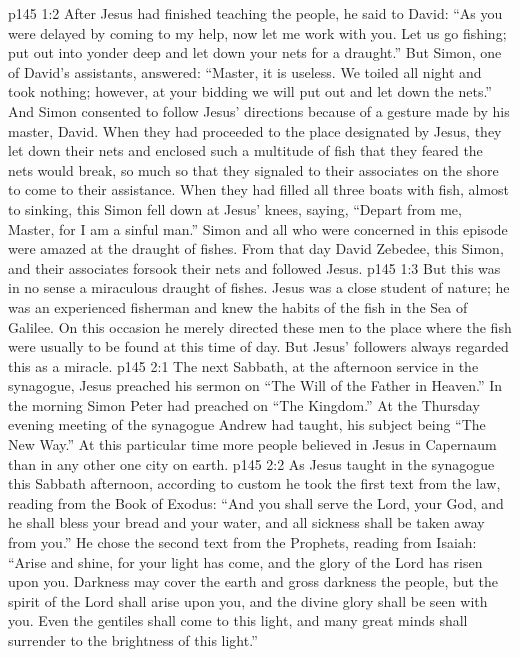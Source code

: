 \vs p145 1:2 After Jesus had finished teaching the people, he said to David: \textcolor{ubdarkred}{“As you were delayed by coming to my help, now let me work with you. Let us go fishing; put out into yonder deep and let down your nets for a draught.”} But Simon, one of David’s assistants, answered: “Master, it is useless. We toiled all night and took nothing; however, at your bidding we will put out and let down the nets.” And Simon consented to follow Jesus’ directions because of a gesture made by his master, David. When they had proceeded to the place designated by Jesus, they let down their nets and enclosed such a multitude of fish that they feared the nets would break, so much so that they signaled to their associates on the shore to come to their assistance. When they had filled all three boats with fish, almost to sinking, this Simon fell down at Jesus’ knees, saying, “Depart from me, Master, for I am a sinful man.” Simon and all who were concerned in this episode were amazed at the draught of fishes. From that day David Zebedee, this Simon, and their associates forsook their nets and followed Jesus.
\vs p145 1:3 But this was in no sense a miraculous draught of fishes. Jesus was a close student of nature; he was an experienced fisherman and knew the habits of the fish in the Sea of Galilee. On this occasion he merely directed these men to the place where the fish were usually to be found at this time of day. But Jesus’ followers always regarded this as a miracle.
\vs p145 2:1 The next Sabbath, at the afternoon service in the synagogue, Jesus preached his sermon on \textcolor{ubdarkred}{“The Will of the Father in Heaven.”} In the morning Simon Peter had preached on “The Kingdom.” At the Thursday evening meeting of the synagogue Andrew had taught, his subject being “The New Way.” At this particular time more people believed in Jesus in Capernaum than in any other one city on earth.
\vs p145 2:2 As Jesus taught in the synagogue this Sabbath afternoon, according to custom he took the first text from the law, reading from the Book of Exodus: \textcolor{ubdarkred}{“And you shall serve the Lord, your God, and he shall bless your bread and your water, and all sickness shall be taken away from you.”} He chose the second text from the Prophets, reading from Isaiah: \textcolor{ubdarkred}{“Arise and shine, for your light has come, and the glory of the Lord has risen upon you. Darkness may cover the earth and gross darkness the people, but the spirit of the Lord shall arise upon you, and the divine glory shall be seen with you. Even the gentiles shall come to this light, and many great minds shall surrender to the brightness of this light.”}
